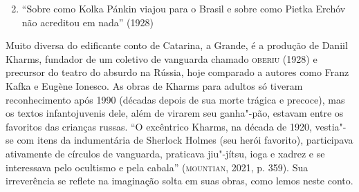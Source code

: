 \documentclass[11pt]{extarticle}
\begin{document}
\begin{enumerate}
\setcounter{enumi}{1}
\item ``Sobre como Kolka Pánkin viajou para o Brasil e sobre como
Pietka Erchóv não acreditou em nada'' (1928)
\end{enumerate}


Muito diversa do edificante conto de Catarina, a Grande, é a produção
de Daniil Kharms, fundador de um coletivo de vanguarda chamado \textsc{oberiu}
(1928) e precursor do teatro do absurdo na Rússia, hoje comparado a
autores como Franz Kafka e Eugène Ionesco. As obras de Kharms para
adultos só tiveram reconhecimento após 1990 (décadas depois de sua
morte trágica e precoce), mas os textos infantojuvenis dele, além de
virarem seu ganha"-pão, estavam entre os favoritos das crianças russas.
``O excêntrico Kharms, na década de 1920, vestia"-se com itens da
indumentária de Sherlock Holmes (seu herói favorito), participava
ativamente de círculos de vanguarda, praticava jiu"-jítsu, ioga e xadrez
e se interessava pelo ocultismo e pela cabala'' (\textsc{mountian}, 2021, p.
359). Sua irreverência se reflete na imaginação solta em suas obras, como
lemos neste conto.
\end{document}
